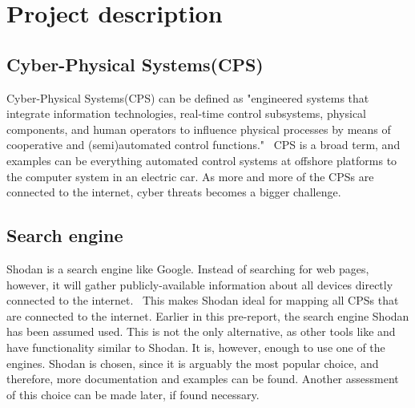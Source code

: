 \section{Project description} \label{sec:desc}

\subsection{Cyber-Physical Systems(CPS)}\label{sec:cps}
Cyber-Physical Systems(CPS) can be defined as "engineered systems that integrate information technologies, real‐time control subsystems, physical components, and human operators to influence physical processes by means of cooperative and (semi)automated control functions."~\cite{guzman_wied_kozine_lundteigen_2019}
CPS is a broad term, and examples can be everything automated control systems at offshore platforms to the computer system in an electric car. As more and more of the CPSs are connected to the internet, cyber threats becomes a bigger challenge. 

\subsection{Search engine} \label{sec:shodan_intro}
Shodan is a search engine like Google. Instead of searching for web pages, however, it will gather publicly-available information about all devices directly connected to the internet.~\cite{shodan} This makes Shodan ideal for mapping all CPSs that are connected to the internet. 
Earlier in this pre-report, the search engine Shodan has been assumed used. This is not the only alternative, as other tools like \href{https://censys.io/}{\color{blue}{Censys}} and \href{www.zoomeye.org}{\color{blue}{ZoomEye}} have functionality similar to Shodan. It is, however, enough to use one of the engines. Shodan is chosen, since it is arguably the most popular choice, and therefore, more documentation and examples can be found. Another assessment of this choice can be made later, if found necessary. 

